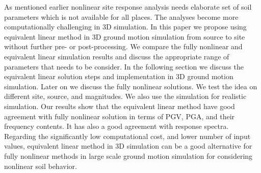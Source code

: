 As mentioned earlier nonlinear site response analysis needs elaborate set of soil parameters which is not available for all places. The analyses become more computationally challenging in 3D simulation. In this paper we propose using equivalent linear method in 3D ground motion simulation from source to site without further pre- or post-processing. We compare the fully nonlinear and equivalent linear simulation results and discuss the appropriate range of parameters that needs to be consider. In the following section we discuss the equivalent linear solution steps and implementation in 3D ground motion simulation. Later on we discuss the fully nonlinear solutions. We test the idea on different site, source, and magnitudes. We also use the simulation for realistic simulation. Our results show that the equivalent linear method have good agreement with fully nonlinear solution in terms of PGV, PGA, and their frequency contents. It has also a good agreement with response spectra. Regarding the significantly low computational cost, and lower number of input values, equivalent linear method in 3D simulation can be a good alternative for fully nonlinear methods in large scale ground motion simulation for considering nonlinear soil behavior. 







